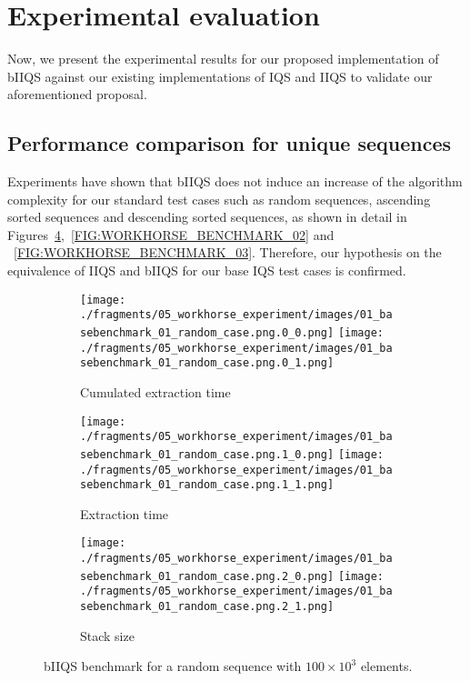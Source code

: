 \section{Experimental evaluation}

Now, we present the experimental results for our proposed implementation of bIIQS against our existing implementations of IQS and IIQS to validate our aforementioned proposal.\\


\subsection{Performance comparison for unique sequences}

Experiments have shown that bIIQS does not induce an increase of the algorithm complexity for our standard test cases such as random sequences, ascending sorted sequences and descending sorted sequences, as shown in detail in Figures~\ref{FIG:WORKHORSE_BENCHMARK_01},~\ref{FIG:WORKHORSE_BENCHMARK_02} and ~\ref{FIG:WORKHORSE_BENCHMARK_03}. Therefore, our hypothesis on the equivalence of IIQS and bIIQS for our base IQS test cases is confirmed. \\


\begin{figure}

    \centering
    \begin{subfigure}[b]{\textwidth}
        \centering
        \texttt{[image: ./fragments/05\_workhorse\_experiment/images/01\_basebenchmark\_01\_random\_case.png.0\_0.png]}
        \texttt{[image: ./fragments/05\_workhorse\_experiment/images/01\_basebenchmark\_01\_random\_case.png.0\_1.png]}
        \caption{Cumulated extraction time}
        \label{FIG:WORKHORSE_BENCHMARK_01__0_0}
    \end{subfigure}

    \begin{subfigure}[b]{\textwidth}
        \centering
        \texttt{[image: ./fragments/05\_workhorse\_experiment/images/01\_basebenchmark\_01\_random\_case.png.1\_0.png]}
        \texttt{[image: ./fragments/05\_workhorse\_experiment/images/01\_basebenchmark\_01\_random\_case.png.1\_1.png]}
        \caption{Extraction time}
        \label{FIG:WORKHORSE_BENCHMARK_01__0_1}
    \end{subfigure}

    \begin{subfigure}[b]{\textwidth}
        \centering
        \texttt{[image: ./fragments/05\_workhorse\_experiment/images/01\_basebenchmark\_01\_random\_case.png.2\_0.png]}
        \texttt{[image: ./fragments/05\_workhorse\_experiment/images/01\_basebenchmark\_01\_random\_case.png.2\_1.png]}
        \caption{Stack size}
        \label{FIG:WORKHORSE_BENCHMARK_01__0_2}
    \end{subfigure}
    
    \caption{bIIQS benchmark for a random sequence with $100\times10^3$ elements.}
       \label{FIG:WORKHORSE_BENCHMARK_01}
\end{figure}



